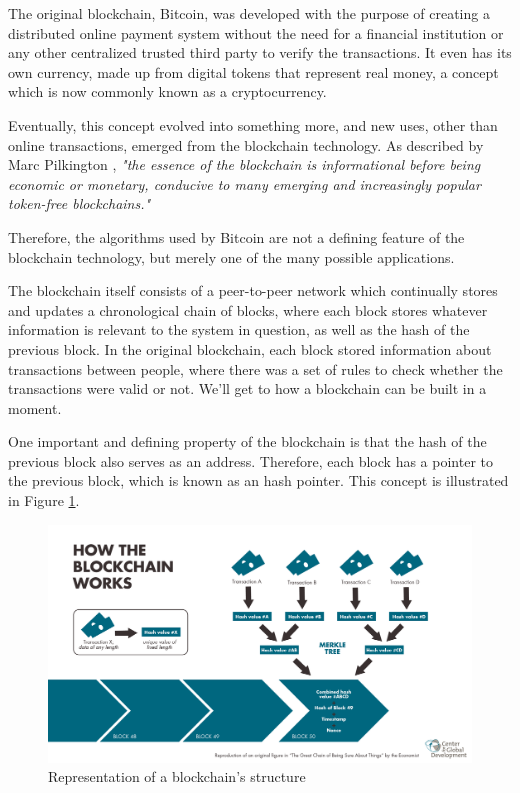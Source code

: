 The original blockchain, Bitcoin, was developed with the purpose of creating a distributed online payment system without the need for a financial institution or any other centralized trusted third party to verify the transactions. It even has its own currency, made up from digital tokens that represent real money, a concept which is now commonly known as a cryptocurrency.

Eventually, this concept evolved into something more, and new uses, other than online transactions, emerged from the blockchain technology. As described by Marc Pilkington \cite{Pilkington2015}, \textit{"the essence of the blockchain is informational before being economic or monetary, conducive to many emerging and increasingly popular token-free blockchains."}

Therefore, the algorithms used by Bitcoin are not a defining feature of the blockchain technology, but merely one of the many possible applications.
    
    The blockchain itself consists of a peer-to-peer network which continually stores and updates a chronological chain of blocks, where each block stores whatever information is relevant to the system in question, as well as the hash of the previous block. In the original blockchain, each block stored information about transactions between people, where there was a set of rules to check whether the transactions were valid or not. We'll get to how a blockchain can be built in a moment.
    
    One important and defining property of the blockchain is that the hash of the previous block also serves as an address. Therefore, each block has a pointer to the previous block, which is known as an hash pointer. This concept is illustrated in Figure \ref{fig:blockchain_workflow}.
    
\begin{figure}[h]
\centering
\includegraphics[scale=0.35]{media/Blockchain_workflow.png}
\caption{Representation of a blockchain's structure}
\label{fig:blockchain_workflow}
\end{figure}

